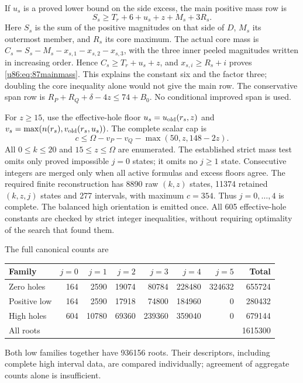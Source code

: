 \documentclass[11pt,a4paper]{article}
\theoremstyle{remark}
\begin{document}
If $u_s$ is a proved lower bound on the side excess, the main positive
mass row is
\begin{equation}\label{u86:eq:87mainmass}
 S_s\ge T_r+6+u_s+z+M_s+3R_s.
\end{equation}
Here $S_s$ is the sum of the positive magnitudes on that side of $D$,
$M_s$ its outermost member, and $R_s$ its core maximum. The actual
core mass is
$C_s=S_s-M_s-x_{s,1}-x_{s,2}-x_{s,3}$, with the three inner peeled
magnitudes written in increasing order. Hence
$C_s\ge T_r+u_s+z$, and $x_{s,i}\ge R_s+i$ proves
\eqref{u86:eq:87mainmass}. This explains the constant six and the factor
three; doubling the core inequality alone would not give the main row.
The conservative span row is
$R_P+R_Q+\delta-4z\le74+B_0$. No conditional improved span is used.

For $z\ge15$, use the effective-hole floor
$u_s=u_{\rm old}(r_s,z)$ and
$v_s=\max(n(r_s),v_{\rm old}(r_s,u_s))$. The complete scalar cap is
\[
 c\le\Omega-v_P-v_Q-\max(50,z,148-2z).
\]
All $0\le k\le20$ and $15\le z\le\Omega$ are enumerated. The
established strict mass test omits only proved impossible $j=0$
states; it omits no $j\ge1$ state. Consecutive integers are merged
only when all active formulas and excess floors agree. The required finite
reconstruction has 8890 raw $(k,z)$ states, 11374 retained
$(k,z,j)$ states and 277 intervals, with maximum $c=354$. Thus
$j=0,\ldots,4$ is complete. The balanced high orientation is emitted
once. All 605 effective-hole constants are checked by strict integer
inequalities, without requiring optimality of the search that found them.

The full canonical counts are
\begin{center}\small
\begin{tabular}{lrrrrrrr}
\toprule
Family&$j=0$&$j=1$&$j=2$&$j=3$&$j=4$&$j=5$&Total\\\midrule
Zero holes&164&2590&19074&80784&228480&324632&655724\\
Positive low&164&2590&17918&74800&184960&0&280432\\
High holes&604&10780&69360&239360&359040&0&679144\\\midrule
All roots&&&&&&&1615300\\\bottomrule
\end{tabular}
\end{center}
Both low families together have 936156 roots. Their descriptors,
including complete high interval data, are compared individually;
agreement of aggregate counts alone is insufficient.
\end{document}
